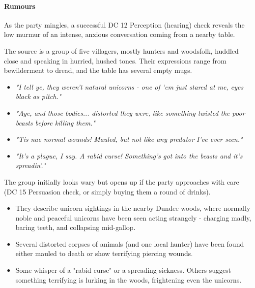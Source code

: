 {\entryfont \paragraph*{Rumours} As the party mingles, a successful DC 12 Perception (hearing) check reveals the low murmur of an intense, anxious conversation coming from a nearby table.

The source is a group of five villagers, mostly hunters and woodsfolk, huddled close and speaking in hurried, hushed tones. Their expressions range from bewilderment to dread, and the table has several empty mugs.
\begin{itemize}
	\item \textit{"I tell ye, they weren't natural unicorns - one of 'em just stared at me, eyes black as pitch."}
	\item \textit{"Aye, and those bodies... distorted they were, like something twisted the poor beasts before killing them."}
	\item \textit{"Tis nae normal wounds! Mauled, but not like any predator I've ever seen."}
	\item \textit{"It's a plague, I say. A rabid curse! Something's got into the beasts and it's spreadin'."}
\end{itemize}
The group initially looks wary but opens up if the party approaches with care (DC 15 Persuasion check, or simply buying them a round of drinks).
\begin{itemize}
	\item They describe unicorn sightings in the nearby Dundee woods, where normally noble and peaceful unicorns have been seen acting strangely - charging madly, baring teeth, and collapsing mid-gallop.
	\item Several distorted corpses of animals (and one local hunter) have been found either mauled to death or show terrifying piercing wounds.
	\item Some whisper of a "rabid curse" or a spreading sickness. Others suggest something terrifying is lurking in the woods, frightening even the unicorns.
\end{itemize}}

